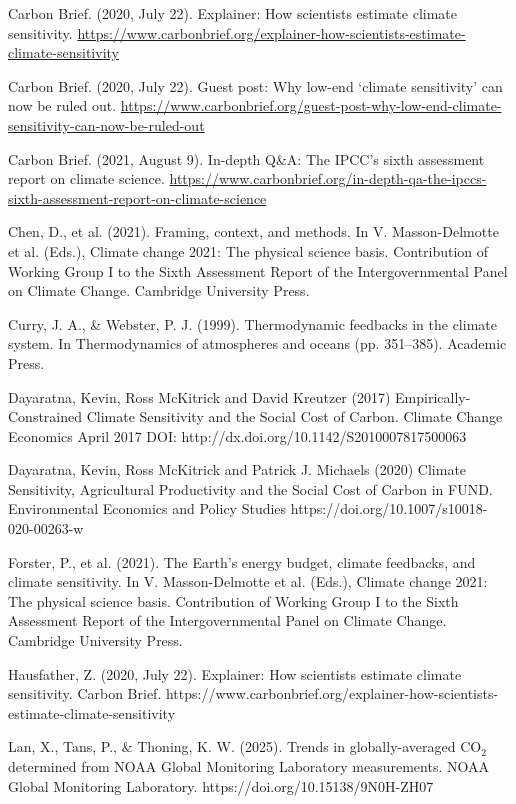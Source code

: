 \documentclass[12pt,paper=a4,DIV=12,parskip=never,chapterprefix=false,headings=standardclasses]{scrreprt}
\begin{document}
Carbon Brief. (2020, July 22). Explainer: How scientists estimate climate sensitivity.
\url{https://www.carbonbrief.org/explainer-how-scientists-estimate-climate-sensitivity}

Carbon Brief. (2020, July 22). Guest post: Why low-end ‘climate sensitivity’ can now be ruled out.
\url{https://www.carbonbrief.org/guest-post-why-low-end-climate-sensitivity-can-now-be-ruled-out}

Carbon Brief. (2021, August 9). In-depth Q\&A: The IPCC’s sixth assessment report on climate science.
\url{https://www.carbonbrief.org/in-depth-qa-the-ipccs-sixth-assessment-report-on-climate-science}

Chen, D., et al. (2021). Framing, context, and methods. In V. Masson-Delmotte et al. (Eds.), Climate
change 2021: The physical science basis. Contribution of Working Group I to the Sixth Assessment
Report of the Intergovernmental Panel on Climate Change. Cambridge University Press.

Curry, J. A., \& Webster, P. J. (1999). Thermodynamic feedbacks in the climate system. In
Thermodynamics of atmospheres and oceans (pp. 351–385). Academic Press.

Dayaratna, Kevin, Ross McKitrick and David Kreutzer (2017) Empirically-Constrained Climate Sensitivity
and the Social Cost of Carbon. Climate Change Economics April 2017 DOI:
http://dx.doi.org/10.1142/S2010007817500063

Dayaratna, Kevin, Ross McKitrick and Patrick J. Michaels (2020) Climate Sensitivity, Agricultural
Productivity and the Social Cost of Carbon in FUND. Environmental Economics and Policy Studies
https://doi.org/10.1007/s10018-020-00263-w

Forster, P., et al. (2021). The Earth's energy budget, climate feedbacks, and climate sensitivity. In V.
Masson-Delmotte et al. (Eds.), Climate change 2021: The physical science basis. Contribution of
Working Group I to the Sixth Assessment Report of the Intergovernmental Panel on Climate Change.
Cambridge University Press.

Hausfather, Z. (2020, July 22). Explainer: How scientists estimate climate sensitivity. Carbon Brief.
https://www.carbonbrief.org/explainer-how-scientists-estimate-climate-sensitivity

Lan, X., Tans, P., \& Thoning, K. W. (2025). Trends in globally-averaged CO$_2$ determined from NOAA
Global Monitoring Laboratory measurements. NOAA Global Monitoring Laboratory.
https://doi.org/10.15138/9N0H-ZH07
\end{document}
